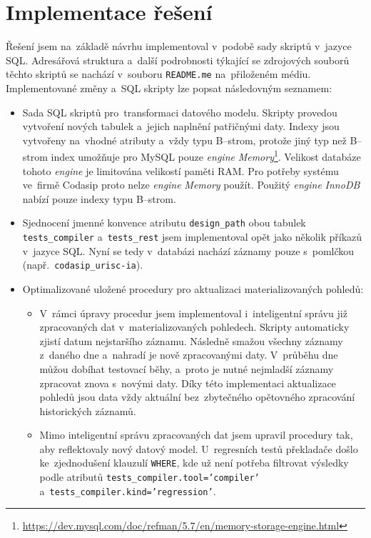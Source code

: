\chapter{Implementace řešení}
\label{chapter:implementace_reseni}
Řešení jsem na~základě návrhu implementoval v~podobě sady skriptů v~jazyce SQL. Adresářová struktura a~další
podrobnosti týkající se zdrojových souborů těchto skriptů se nachází v~souboru \texttt{README.me} na~přiloženém médiu.
Implementované změny a~SQL skripty lze popsat následovným seznamem:
\begin{itemize}[listparindent=1.55em, parsep=0em]
    \item Sada SQL skriptů pro~transformaci datového modelu. Skripty provedou vytvoření nových tabulek a~jejich naplnění patřičnými daty. Indexy jsou vytvořeny na~vhodné atributy a~vždy typu B--strom, protože jiný typ než B--strom index umožňuje pro MySQL pouze \textit{engine} \textit{Memory}\footnote{\href{https://dev.mysql.com/doc/refman/5.7/en/memory-storage-engine.html}{https://dev.mysql.com/doc/refman/5.7/en/memory-storage-engine.html}}. Velikost databáze tohoto \textit{engine} je limitována velikostí paměti RAM. Pro potřeby systému ve~firmě Codasip proto nelze \textit{engine} \textit{Memory} použít. Použitý \textit{engine} \textit{InnoDB} nabízí pouze indexy typu B--strom.


    \item Sjednocení jmenné konvence atributu \texttt{design\_path} obou tabulek \texttt{tests\_compiler}
    a~\texttt{tests\_rest} jsem implementoval opět jako několik příkazů v~jazyce SQL. Nyní se tedy v~databázi
    nachází záznamy pouze s~pomlčkou (např.~\texttt{codasip\_urisc-ia}).


    \item Optimalizované uložené procedury pro aktualizaci materializovaných pohledů:
    \begin{itemize}
        \item V~rámci úpravy procedur jsem implementoval i~inteligentní správu již zpracovaných dat
        v~materializovaných pohledech. Skripty automaticky zjistí datum nejstaršího záznamu. Následně smažou všechny záznamy z~daného dne a~nahradí je nově zpracovanými daty. V~průběhu dne můžou dobíhat testovací běhy, a~proto je nutné nejmladší záznamy zpracovat znova s~novými daty. Díky této implementaci aktualizace pohledů jsou data vždy aktuální bez~zbytečného opětovného zpracování historických záznamů.

        \item Mimo inteligentní správu zpracovaných dat jsem upravil procedury tak, aby reflektovaly nový datový model. U~regresních testů překladače došlo ke~zjednodušení klauzulí \texttt{WHERE}, kde už není potřeba filtrovat výsledky podle atributů \texttt{tests\_compiler.tool='compiler'}  a~\texttt{tests\_compiler.kind='regression'}.
    \end{itemize}



\end{itemize}
